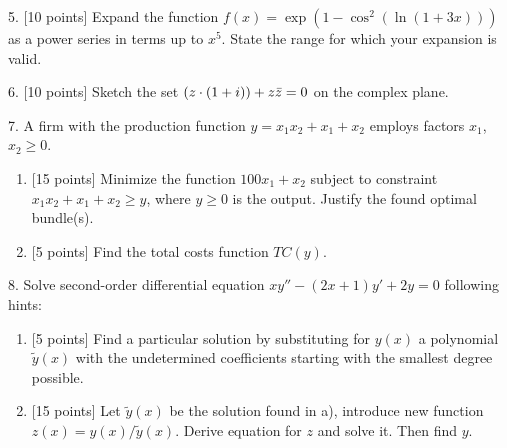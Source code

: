 \documentclass[12pt,a4paper]{article}
\let\Re\relax
\DeclareMathOperator{\Re}{Re}
\begin{document}
\newpage
{}

5. {[10 points]} Expand the function $f(x) = \exp(1 - \cos^2 (\ln(1 + 3x)))$ as a power series in terms up to $x^5$. 
  State the range for which your expansion is valid.

 \newpage 



6. {[10 points]} Sketch the set $\Re(z\cdot (1+i))+z\bar z =0$ on the complex plane.


\newpage
{}

	7. A firm with the production function $y=x_1x_2+x_1+x_2$ employs factors $x_1$, $x_2 \geq 0$.
	  \begin{enumerate}[label=\alph*)]
	    \item {[15 points]} Minimize the function $100x_1+x_2$  subject to constraint  $x_1x_2+x_1+x_2 \geq y$, where  $y\geq 0$ is the output. 
	      Justify the found optimal bundle(s).
	    \item {[5 points]} Find the total costs function  $TC(y)$.
	  \end{enumerate}


	  \newpage
{}
	
	8. Solve second-order differential equation $xy''-(2x+1)y'+2y=0$ following hints: 
	\begin{enumerate}[label=\alph*)]
	    \item {[5 points]} Find a particular solution by substituting for $y(x)$ a polynomial $\tilde y(x)$ with 
	      the undetermined coefficients starting with the smallest degree possible.
	    \item {[15 points]} Let $\tilde y(x)$  be the solution found in a),  introduce new function $z(x)=y(x)/\tilde y(x)$. 
	      Derive equation for $z$ and solve it. Then find $y$.
	  \end{enumerate}
      
\end{document}
